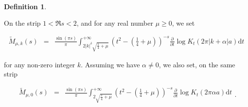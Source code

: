 \documentclass{jams-l}
\theoremstyle{definition}
\newtheorem{definition}[theorem]{Definition}
\theoremstyle{remark}
\numberwithin{equation}{section}
\begin{document}
        \begin{definition}
        \label{DefMtildemuk}
                
            On the strip $1 < \Re s < 2$, and for any real number $\mu \geqslant 0$, we set
            
            \[ \begin{array}{lll}
                    \widetilde{M}_{\mu,k} \left( s \right) & = & \frac{\sin \left( \pi s \right)}{\pi} \int_{2 \left \vert k \right \vert^{\delta} \sqrt{\frac{1}{4} + \mu}}^{+ \infty} \left( t^2 - \left( \frac{1}{4} + \mu \right) \right)^{-s} \frac{\partial}{\partial t} \log K_t \left( 2\pi \left \vert k + \alpha \right \vert a \right) \mathrm{d}t
                \end{array} \]
            
            \noindent for any non-zero integer $k$. Assuming we have $\alpha \neq 0$, we also set, on the same strip
            
            \[ \begin{array}{lll}
                    \widetilde{M}_{\mu,0} \left( s \right) & = & \frac{\sin \left( \pi s \right)}{\pi} \int_{2 \sqrt{\frac{1}{4} + \mu}}^{+ \infty} \left( t^2 - \left( \frac{1}{4} + \mu \right) \right)^{-s} \frac{\partial}{\partial t} \log K_t \left( 2 \pi \alpha a \right) \mathrm{d}t
                \end{array} . \]
                
        \end{definition}
        
\end{document}
